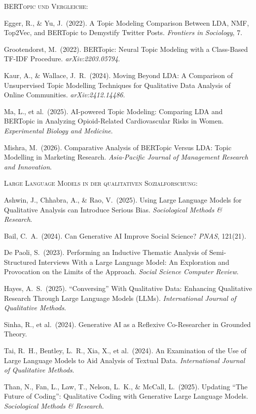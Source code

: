 \documentclass[a4paper,11pt]{article}
\begin{document}
\bigskip
\textsc{BERTopic und Vergleiche:}

Egger, R., \& Yu, J.\ (2022). A Topic Modeling Comparison Between
LDA, NMF, Top2Vec, and BERTopic to Demystify Twitter Posts.
\emph{Frontiers in Sociology}, 7.

Grootendorst, M.\ (2022). BERTopic: Neural Topic Modeling with a
Class-Based TF-IDF Procedure. \emph{arXiv:2203.05794}.

Kaur, A., \& Wallace, J.\ R.\ (2024). Moving Beyond LDA: A Comparison
of Unsupervised Topic Modelling Techniques for Qualitative Data
Analysis of Online Communities. \emph{arXiv:2412.14486}.

Ma, L., et al.\ (2025). AI-powered Topic Modeling: Comparing LDA
and BERTopic in Analyzing Opioid-Related Cardiovascular Risks in
Women. \emph{Experimental Biology and Medicine}.

Mishra, M.\ (2026). Comparative Analysis of BERTopic Versus LDA:
Topic Modelling in Marketing Research. \emph{Asia-Pacific Journal of
Management Research and Innovation}.

\bigskip
\textsc{Large Language Models in der qualitativen Sozialforschung:}

Ashwin, J., Chhabra, A., \& Rao, V.\ (2025). Using Large Language
Models for Qualitative Analysis can Introduce Serious Bias.
\emph{Sociological Methods \& Research}.

Bail, C.\ A.\ (2024). Can Generative AI Improve Social Science?
\emph{PNAS}, 121(21).

De Paoli, S.\ (2023). Performing an Inductive Thematic Analysis of
Semi-Structured Interviews With a Large Language Model: An
Exploration and Provocation on the Limits of the Approach.
\emph{Social Science Computer Review}.

Hayes, A.\ S.\ (2025). \enquote{Conversing} With Qualitative Data:
Enhancing Qualitative Research Through Large Language Models (LLMs).
\emph{International Journal of Qualitative Methods}.

Sinha, R., et al.\ (2024). Generative AI as a Reflexive Co-Researcher
in Grounded Theory.

Tai, R.\ H., Bentley, L.\ R., Xia, X., et al.\ (2024). An Examination
of the Use of Large Language Models to Aid Analysis of Textual Data.
\emph{International Journal of Qualitative Methods}.

Than, N., Fan, L., Law, T., Nelson, L.\ K., \& McCall, L.\ (2025).
Updating \enquote{The Future of Coding}: Qualitative Coding with
Generative Large Language Models. \emph{Sociological Methods \&
Research}.
\end{document}
